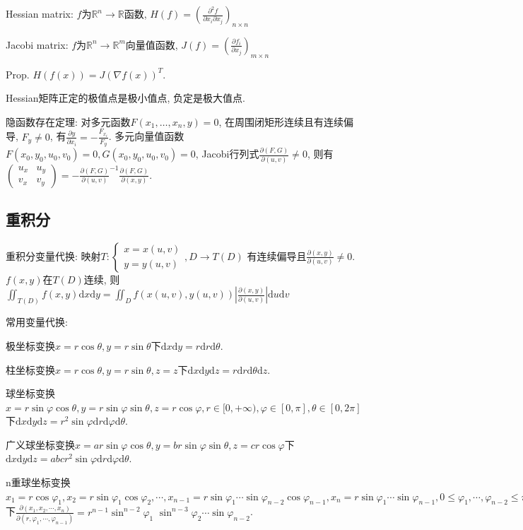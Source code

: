 \documentclass[UTF8]{ctexart}
\begin{document}
Hessian matrix: $f$为$\mathbb{R}^n\to\mathbb{R}$函数,
$H(f)=\left(\frac{\partial^2 f}{\partial x_i \partial x_j}\right)_{n\times n}$

Jacobi matrix: $f$为$\mathbb{R}^n\to \mathbb{R}^m$向量值函数,
$J(f)=\left(\frac{\partial f_i}{\partial x_j}\right)_{m\times n}$

Prop. $H(f(x))=J(\nabla f(x))^T$.

Hessian矩阵正定的极值点是极小值点, 负定是极大值点.

隐函数存在定理:
对多元函数$F(x_1,\dots,x_n,y)=0$, 在周围闭矩形连续且有连续偏导, $F_y\neq 0$, 有$\frac{\partial y}{\partial x_i}=-\frac{F_{x_i}}{F_y}$.
多元向量值函数$F(x_0,y_0,u_0,v_0)=0, G(x_0,y_0,u_0,v_0)=0$, Jacobi行列式$\frac{\partial(F,G)}{\partial(u,v)}\neq 0$,
则有$\begin{pmatrix} u_x & u_y \\ v_x  & v_y \end{pmatrix} = -\frac{\partial(F,G)}{\partial(u,v)} ^{-1}\frac{\partial(F,G)}{\partial(x,y)}$.


\subsection{重积分}

重积分变量代换:
映射$T:
	\left\{\begin{matrix}
		x=x(u,v) \\y=y(u,v)
	\end{matrix}\right.,D\to T(D)$
有连续偏导且$\frac{\partial(x,y)}{\partial(u,v)}\neq 0$.
$f(x,y)$在$T(D)$连续, 则
$\iint_{T(D)}f(x,y)\mathrm{d}x\mathrm{d}y=\iint_{D} f(x(u,v), y(u,v))
	\left|\frac{\partial(x,y)}{\partial(u,v)}\right| \mathrm{d}u\mathrm{d}v$


\noindent 常用变量代换:\par
极坐标变换$x=r\cos\theta,y=r\sin\theta$下$\mathrm{d}x\mathrm{d}y=r\mathrm{d}r\mathrm{d}\theta$.\par
柱坐标变换$x=r\cos\theta,y=r\sin\theta,z=z$下$\mathrm{d}x\mathrm{d}y\mathrm{d}z=r\mathrm{d}r\mathrm{d}\theta\mathrm{d}z$.\par
球坐标变换$x=r\sin\varphi\cos\theta,y=r\sin\varphi\sin\theta,z=r\cos\varphi,
	r\in[0,+\infty),\varphi\in[0,\pi],\theta\in[0,2\pi]$下$\mathrm{d}x\mathrm{d}y\mathrm{d}z
	=r^2\sin\varphi \mathrm{d}r\mathrm{d}\varphi \mathrm{d}\theta$.\par
广义球坐标变换$x=ar\sin\varphi\cos\theta,y=br\sin\varphi\sin\theta,z=cr\cos\varphi$下$\mathrm{d}x\mathrm{d}y\mathrm{d}z
	=abcr^2\sin\varphi \mathrm{d}r\mathrm{d}\varphi \mathrm{d}\theta$.\par
n重球坐标变换$x_{1}=r \cos \varphi_{1}, x_{2}=r \sin \varphi_{1} \cos \varphi_{2}, \cdots,
	x_{n-1}=r \sin \varphi_{1}\cdots \sin \varphi_{n-2} \cos \varphi_{n-1},
	x_{n}=r \sin \varphi_{1}\cdots\sin \varphi_{n-1},
	0\leq \varphi_1,\cdots,\varphi_{n-2}\leq \pi,0\leq \varphi_{n-1}\leq 2\pi$下$
	\frac{\partial\left(x_{1}, x_{2}, \cdots, x_{n}\right)}{\partial\left(r, \varphi_{1}, \cdots, \varphi_{n-1}\right)}=
	r^{n-1} \sin ^{n-2} \varphi_{1}$
$\sin ^{n-3} \varphi_{2} \cdots \sin \varphi_{n-2} $.
\end{document}
